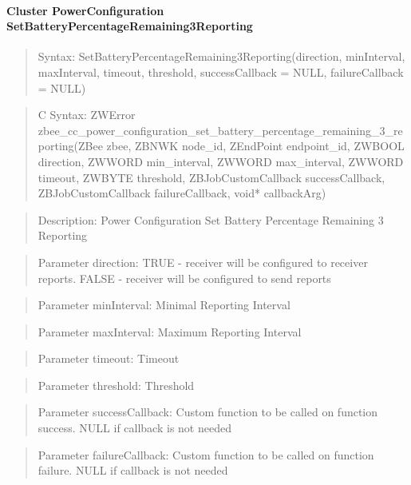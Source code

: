 \paragraph{Cluster PowerConfiguration SetBatteryPercentageRemaining3Reporting}
\begin{quote}Syntax: SetBatteryPercentageRemaining3Reporting(direction, minInterval, maxInterval, timeout, threshold, successCallback = NULL, failureCallback = NULL)\end{quote}
\begin{quote}C Syntax: ZWError zbee\_cc\_power\_configuration\_set\_battery\_percentage\_remaining\_3\_reporting(ZBee zbee, ZBNWK node\_id, ZEndPoint endpoint\_id, ZWBOOL direction, ZWWORD min\_interval, ZWWORD max\_interval, ZWWORD timeout, ZWBYTE threshold, ZBJobCustomCallback successCallback, ZBJobCustomCallback failureCallback, void* callbackArg)\end{quote}
\begin{quote}Description: Power Configuration Set Battery Percentage Remaining 3 Reporting\end{quote}
\begin{quote}Parameter direction: TRUE  - receiver will be configured to receiver reports. FALSE - receiver will be configured to send reports\end{quote}
\begin{quote}Parameter minInterval: Minimal Reporting Interval\end{quote}
\begin{quote}Parameter maxInterval: Maximum Reporting Interval\end{quote}
\begin{quote}Parameter timeout: Timeout\end{quote}
\begin{quote}Parameter threshold: Threshold\end{quote}
\begin{quote}Parameter successCallback: Custom function to be called on function success. NULL if callback is not needed\end{quote}
\begin{quote}Parameter failureCallback: Custom function to be called on function failure. NULL if callback is not needed\end{quote}


